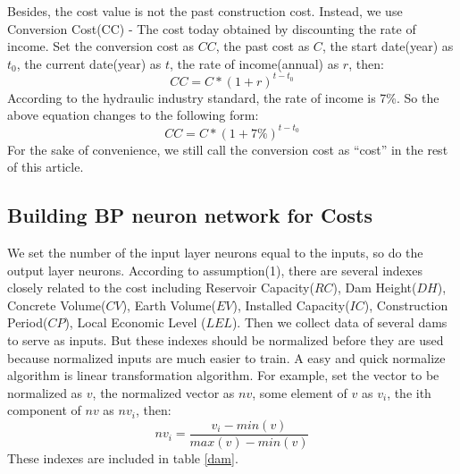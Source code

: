 \documentclass[12pt]{article}%
\newcommand{\upcite}[1]{\textsuperscript{\textsuperscript{\cite{#1}}}}%
\begin{document}
Besides, the cost value is not the past construction cost. Instead, we use Conversion Cost(CC) - The cost today obtained by discounting the rate of income. Set the conversion cost as $CC$, the past cost as $C$, the start date(year) as $t_{0}$, the current date(year) as $t$, the rate of income(annual) as $r$, then:
$$CC = C * (1 + r)^{t-t_{0}}$$
According to the hydraulic industry standard, the rate of income is 7\%. So the above equation changes to the following form:
$$CC = C * (1 + 7\%)^{t-t_{0}}$$
For the sake of convenience, we still call the conversion cost as “cost” in the rest of this article.


\subsection{Building BP neuron network for Costs}
We set the number of the input layer neurons equal to the inputs, so do the output layer neurons. According to assumption(1), there are several indexes closely related to the cost including Reservoir Capacity($RC$), Dam Height($DH$), Concrete Volume($CV$), Earth Volume($EV$), Installed Capacity($IC$), Construction Period($CP$), Local Economic Level ($LEL$). Then we collect data of several dams to serve as inputs. But these indexes should be normalized before they are used because normalized inputs are much easier to train. A easy and quick normalize algorithm is linear transformation algorithm. For example, set the vector to be normalized as $v$, the normalized vector as $nv$, some element of $v$ as $v_{i}$, the ith component of $nv$ as $nv_{i}$, then:
$$nv_{i} = \frac{v_{i}-min(v)}{max(v) - min(v)}$$
These indexes are included in table \ref{dam}.\upcite{wiki}
\end{document}
